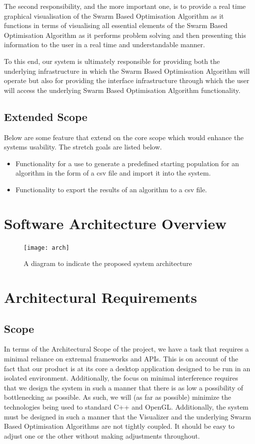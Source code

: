 \documentclass[11pt]{article}
\begin{document}
The second responsibility, and the more important one, is to provide a real time graphical visualisation of the Swarm Based Optimisation Algorithm as it functions in terms of visualising all essential elements of the Swarm Based Optimisation Algorithm as it performs problem solving and then presenting this information to the user in a real time and understandable manner.

To this end, our system is ultimately responsible for providing both the underlying infrastructure in which the Swarm Based Optimisation Algorithm will operate but also for providing the interface infrastructure through which the user will access the underlying Swarm Based Optimisation Algorithm functionality.

\subsection{Extended Scope}
Below are some feature that extend on the core scope which would enhance the systems usability. The stretch goals are listed below.
\begin{itemize}
\item Functionality for a use to generate a predefined starting population for an algorithm in the form of a csv file and import it into the system.
\item Functionality to export the results of an algorithm to a csv file.
\end{itemize}

\section{Software Architecture Overview}
\begin{figure}[h]
\texttt{[image: arch]}
\caption{A diagram to indicate the proposed system architecture}
\end{figure}

\section{Architectural Requirements}
\subsection{Scope}
In terms of the Architectural Scope of the project, we have a task that requires a minimal reliance on extremal frameworks and APIs. This is on account of the fact that our product is at its core a desktop application designed to be run in an isolated environment. Additionally, the focus on minimal interference requires that we design the system in such a manner that there is as low a possibility of bottlenecking as possible. As such, we will (as far as possible) minimize the technologies being used to standard C++ and OpenGL. Additionally, the system must be designed in such a manner that the Visualizer and the underlying Swarm Based Optimisation Algorithms are not tightly coupled. It should be easy to adjust one or the other without making adjustments throughout.
\end{document}
